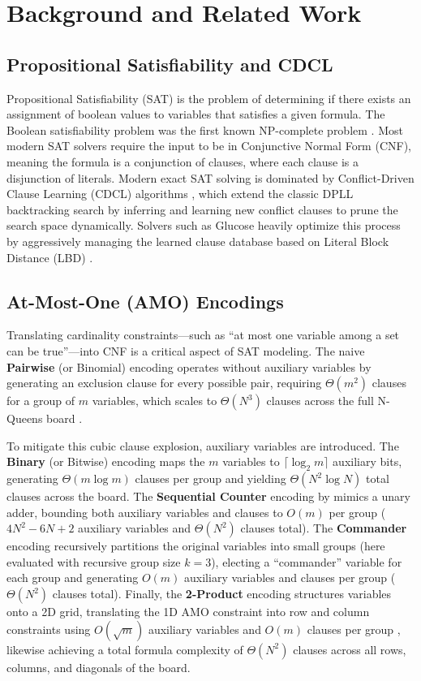 \section{Background and Related Work}
\label{sec:background}

\subsection{Propositional Satisfiability and CDCL}
Propositional Satisfiability (SAT) is the problem of determining if there exists an assignment of boolean values to variables that satisfies a given formula. The Boolean satisfiability problem was the first known NP-complete problem \citep{cook1971complexity}. Most modern SAT solvers require the input to be in Conjunctive Normal Form (CNF), meaning the formula is a conjunction of clauses, where each clause is a disjunction of literals. Modern exact SAT solving is dominated by Conflict-Driven Clause Learning (CDCL) algorithms \citep{marques2009conflict}, which extend the classic DPLL backtracking search by inferring and learning new conflict clauses to prune the search space dynamically. Solvers such as Glucose heavily optimize this process by aggressively managing the learned clause database based on Literal Block Distance (LBD) \citep{audemard2009predicting}.

\subsection{At-Most-One (AMO) Encodings}
Translating cardinality constraints---such as ``at most one variable among a set can be true''---into CNF is a critical aspect of SAT modeling. The naive \textbf{Pairwise} (or Binomial) encoding operates without auxiliary variables by generating an exclusion clause for every possible pair, requiring $\Theta(m^2)$ clauses for a group of $m$ variables, which scales to $\Theta(N^3)$ clauses across the full N-Queens board \citep{frisch2010sat}. 

To mitigate this cubic clause explosion, auxiliary variables are introduced. The \textbf{Binary} (or Bitwise) encoding maps the $m$ variables to $\lceil \log_2 m \rceil$ auxiliary bits, generating $\Theta(m \log m)$ clauses per group \citep{frisch2010sat} and yielding $\Theta(N^2 \log N)$ total clauses across the board. The \textbf{Sequential Counter} encoding by \cite{sinz2005towards} mimics a unary adder, bounding both auxiliary variables and clauses to $O(m)$ per group ($4N^2 - 6N + 2$ auxiliary variables and $\Theta(N^2)$ clauses total). The \textbf{Commander} encoding \citep{klieber2007solving} recursively partitions the original variables into small groups (here evaluated with recursive group size $k=3$), electing a ``commander'' variable for each group and generating $O(m)$ auxiliary variables and clauses per group ($\Theta(N^2)$ clauses total). Finally, the \textbf{2-Product} encoding structures variables onto a 2D grid, translating the 1D AMO constraint into row and column constraints using $O(\sqrt{m})$ auxiliary variables and $O(m)$ clauses per group \citep{chen2010new}, likewise achieving a total formula complexity of $\Theta(N^2)$ clauses across all rows, columns, and diagonals of the board. 

